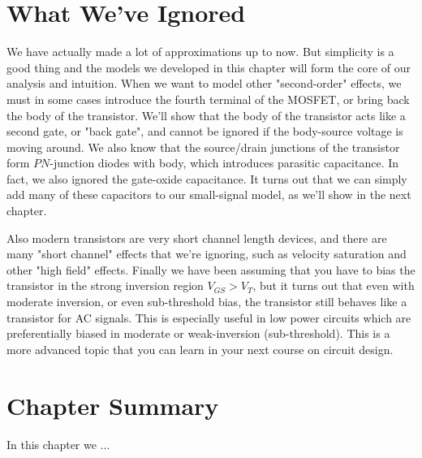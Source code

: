 \section{What We've Ignored}
We have actually made a lot of approximations up to now.  But simplicity is a good thing and the models we developed in this chapter will form the core of our analysis and intuition.  When we want to model other "second-order" effects, we must in some cases introduce the fourth terminal of the MOSFET, or bring back the body of the transistor.  We'll show that the body of the transistor acts like a second gate, or "back gate", and cannot be ignored if the body-source voltage is moving around.  We also know that the source/drain junctions of the transistor form $PN$-junction diodes with body, which  introduces parasitic capacitance.  In fact, we also ignored the gate-oxide capacitance. It turns out that we can simply add many of these capacitors to our small-signal model, as we'll show in the next chapter.

Also modern transistors are very short channel length devices, and there are many "short channel" effects that we're ignoring, such as velocity saturation and other "high field" effects.  Finally we have been assuming that you have to bias the transistor in the strong inversion region $V_{GS} > V_T$, but it turns out that even with moderate inversion, or even sub-threshold bias, the transistor still behaves like a transistor for AC signals.  This is especially useful in low power circuits which are preferentially biased in moderate or weak-inversion (sub-threshold).  This is a more advanced topic that you can learn in your next course on circuit design.
\newpage
\section{Chapter Summary}
In this chapter we ...
